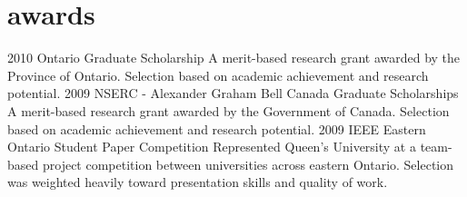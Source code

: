\section{awards}

\begin{entrylist}
\entry
{2010}
{Ontario Graduate Scholarship}
{}
{A merit-based research grant awarded by the Province of Ontario. Selection based on academic achievement and research potential. }
\entry
{2009}
{NSERC - Alexander Graham Bell Canada Graduate Scholarships }
{}
{A merit-based research grant awarded by the Government of Canada. Selection based on academic achievement and research potential.}
\entry
{2009}
{IEEE Eastern Ontario Student Paper Competition }
{}
{Represented Queen’s University at a team-based project competition between universities across eastern Ontario. Selection was weighted heavily toward presentation skills and quality of work. }

\end{entrylist}
